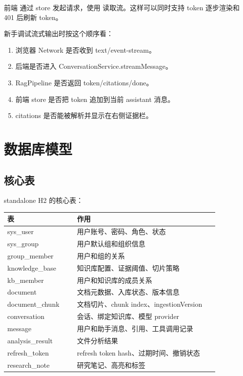 \documentclass[UTF8,zihao=-4]{ctexart}
\begin{document}
前端  通过 store 发起请求，使用  读取流。这样可以同时支持 token 逐步渲染和 401 后刷新 token。

新手调试流式输出时按这个顺序看：

\begin{enumerate}
  \item 浏览器 Network 是否收到 text/event-stream。
  \item 后端是否进入 ConversationService.streamMessage。
  \item RagPipeline 是否返回 token/citations/done。
  \item 前端 store 是否把 token 追加到当前 assistant 消息。
  \item citations 是否能被解析并显示在右侧证据栏。
\end{enumerate}

\section{数据库模型}

\subsection{核心表}

standalone H2 的核心表：

\begin{longtable}{L{0.28\linewidth}L{0.58\linewidth}}
\toprule
表 & 作用 \\
\midrule
sys\_user & 用户账号、密码、角色、状态 \\
sys\_group & 用户默认组和组织信息 \\
group\_member & 用户和组的关系 \\
knowledge\_base & 知识库配置、证据阈值、切片策略 \\
kb\_member & 用户和知识库的成员关系 \\
document & 文档元数据、入库状态、版本信息 \\
document\_chunk & 文档切片、chunk index、ingestionVersion \\
conversation & 会话、绑定知识库、模型 provider \\
message & 用户和助手消息、引用、工具调用记录 \\
analysis\_result & 文件分析结果 \\
refresh\_token & refresh token hash、过期时间、撤销状态 \\
research\_note & 研究笔记、高亮和标签 \\
\bottomrule
\end{longtable}
\end{document}
